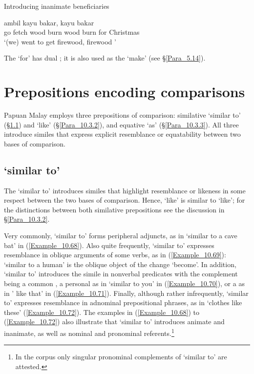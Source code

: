 \begin{styleExampleTitle}
Introducing inanimate beneficiaries
\end{styleExampleTitle}

\ea
\label{Example_10.67}
 {ambil} {kayu} {bakar,} {kayu} {bakar} {} {}\\ %
 go  fetch  wood  burn  wood  burn  for  Christmas\\
\glt
‘(we) went to get firewood, firewood ’ \textstyleExampleSource{[081006-017-Cv.0014]}
\z


The   ‘for’ has dual ; it is also used as the    ‘make’ (see §\ref{Para_5.14}).


\section{Prepositions encoding comparisons}
\label{Para_10.3}
Papuan Malay employs three prepositions of comparison: similative  ‘similar to’ (§\ref{Para_10.3.1}) and  ‘like’ (§\ref{Para_10.3.2}), and equative  ‘as’ (§\ref{Para_10.3.3}). All three introduce similes that express explicit resemblance or equatability between two bases of comparison.


\subsection{ ‘similar to’}
\label{Para_10.3.1}
The   ‘similar to’ introduces similes that highlight resemblance or likeness in some respect between the two bases of comparison. Hence,  ‘like’ is similar to  ‘like’; for the distinctions between both similative prepositions see the discussion in §\ref{Para_10.3.2}.



Very commonly,  ‘similar to’ forms peripheral adjuncts, as in  ‘similar to a cave bat’ in (\ref{Example_10.68}). Also quite frequently,  ‘similar to’ expresses resemblance in oblique arguments of some  verbs, as in (\ref{Example_10.69}):  ‘similar to a human’ is the oblique object of the change   ‘become’. In addition,  ‘similar to’ introduces the simile in nonverbal predicates with the complement being a common , a personal  as in  ‘similar to you’ in (\ref{Example_10.70}), or a  as in ’ like that’ in (\ref{Example_10.71}). Finally, although rather infrequently,  ‘similar to’ expresses resemblance in adnominal prepositional phrases, as in  ‘clothes like these’ (\ref{Example_10.72}). The examples in (\ref{Example_10.68}) to (\ref{Example_10.72}) also illustrate that  ‘similar to’ introduces animate and inanimate, as well as nominal and pronominal referents.\footnote{In the corpus only singular pronominal complements of  ‘similar to’ are attested.}


